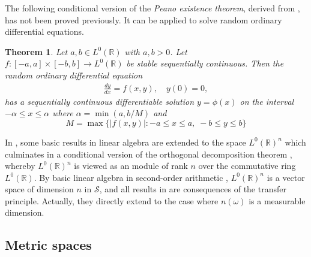 \documentclass{jloganal}
\numberwithin{equation}{section}
\theoremstyle{plain}
\newtheorem{theorem}[subsection]{Theorem}
\renewcommand{\leq}{\leqslant}
\begin{document}
The following conditional version of the \emph{Peano existence theorem}, derived from \cite[Theorem IV.8.1]{simpson2009subsystems}, has not been proved previously. 
It can be applied to solve random ordinary differential equations.  
\begin{theorem}
Let $a,b\in L^0(\mathbb{R})$ with $a,b>0$. Let $f\colon [-a,a]\times [-b,b]\to L^0(\mathbb{R})$ be stable sequentially continuous. 
Then the random ordinary differential equation 
\begin{align*}
\frac{dy}{dx}=f(x,y), \quad y(0)=0, 
\end{align*}
has a sequentially continuous differentiable solution $y=\phi(x)$ on the interval $-\alpha\leq x\leq \alpha$ where $\alpha=\min(a,b/M)$ and 
\[
M=\max\{|f(x,y)|\colon -a\leq x\leq a, \; -b\leq y\leq b\}
\]
\end{theorem}
In \cite[Section 2]{cheridito2015conditional}, some basic results in linear algebra are extended to the space $L^0(\mathbb{R})^n$ which culminates in a conditional version of the orthogonal decomposition theorem \cite[Corollary 2.12]{cheridito2015conditional}, whereby $L^0(\mathbb{R})^n$ is viewed as an module of rank $n$ over the commutative ring $L^0(\mathbb{R})$.  
By basic linear algebra in second-order arithmetic \cite{simpson2009subsystems}, $L^0(\mathbb{R})^n$ is a vector space of dimension $n$ in $\mathcal{S}$, and all results in \cite[Section 2]{cheridito2015conditional} are consequences of the transfer principle. 
Actually, they directly extend to the case where $n(\omega)$ is a measurable dimension. 

\subsection{Metric spaces}\label{sec:metric} 
\end{document}
